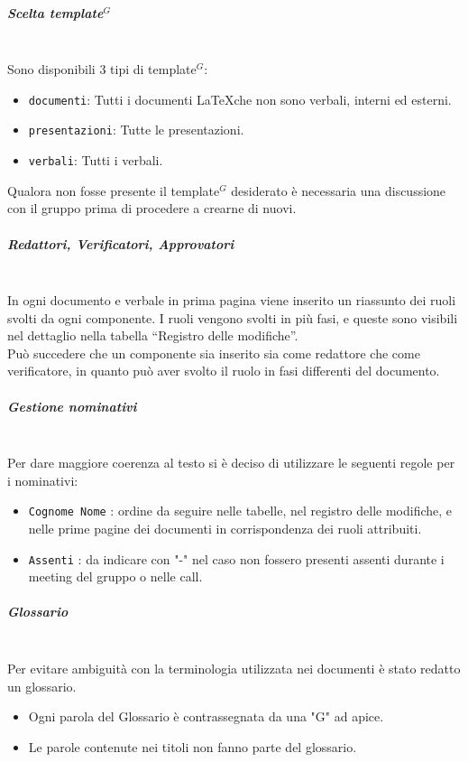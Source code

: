 \subparagraph{Scelta template$^G$}
\mbox{}\\
Sono disponibili 3 tipi di template$^G$:
\begin{itemize}
    \item \texttt{documenti}: Tutti i documenti \LaTeX \space che non sono verbali, interni ed esterni.
    \item \texttt{presentazioni}: Tutte le presentazioni.
    \item \texttt{verbali}: Tutti i verbali.
\end{itemize}
Qualora non fosse presente il template$^G$ desiderato è necessaria una discussione con il gruppo prima di procedere a crearne di nuovi.

\subparagraph{Redattori, Verificatori, Approvatori}
\mbox{}\\
In ogni documento e verbale in prima pagina viene inserito un riassunto dei ruoli svolti da ogni componente.
I ruoli vengono svolti in più fasi, e queste sono visibili nel dettaglio nella tabella ``Registro delle modifiche''.\\
Può succedere che un componente sia inserito sia come redattore che come verificatore, in quanto può aver svolto il ruolo in fasi differenti del documento.

\subparagraph{Gestione nominativi}
\mbox{}\\
Per dare maggiore coerenza al testo si è deciso di utilizzare le seguenti regole per i nominativi:
\begin{itemize}
	\item \texttt{Cognome Nome} : ordine da seguire nelle tabelle, nel registro delle modifiche, e nelle prime pagine dei documenti in corrispondenza dei ruoli attribuiti.
	\item \texttt{Assenti} : da indicare con "-" nel caso non fossero presenti assenti durante i meeting del gruppo o nelle call.
\end{itemize}

\subparagraph{Glossario}
\mbox{}\\
Per evitare ambiguità con la terminologia utilizzata nei documenti è stato redatto un glossario.
\begin{itemize}
    \item Ogni parola del Glossario è contrassegnata da una "G" ad apice.
    \item Le parole contenute nei titoli non fanno parte del glossario.
\end{itemize}

